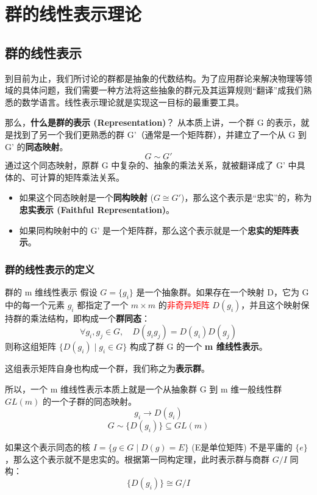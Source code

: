 
\chapter{群的线性表示理论}
\section{群的线性表示}
到目前为止，我们所讨论的群都是抽象的代数结构。为了应用群论来解决物理等领域的具体问题，我们需要一种方法将这些抽象的群元及其运算规则“翻译”成我们熟悉的数学语言。线性表示理论就是实现这一目标的最重要工具。

那么，\textbf{什么是群的表示 (Representation)}？
从本质上讲，一个群 G 的表示，就是找到了另一个我们更熟悉的群 G'（通常是一个矩阵群），并建立了一个从 G 到 G' 的\textbf{同态映射}。
$$
    G \sim G'
$$
通过这个同态映射，原群 G 中复杂的、抽象的乘法关系，就被翻译成了 G' 中具体的、可计算的矩阵乘法关系。


\begin{itemize}
    \item 如果这个同态映射是一个\textbf{同构映射} ($G \cong G'$)，那么这个表示是“忠实”的，称为\textbf{忠实表示 (Faithful Representation)}。
    \item 如果同构映射中的 G' 是一个矩阵群，那么这个表示就是一个\textbf{忠实的矩阵表示}。
\end{itemize}

\subsection{群的线性表示的定义}
\begin{definition}{群的 m 维线性表示}
    假设 $G=\{g_i\}$ 是一个抽象群。如果存在一个映射 D，它为 G 中的每一个元素 $g_i$ 都指定了一个 $m \times m$ 的\textcolor{red}{非奇异矩阵} $D(g_i)$，并且这个映射保持群的乘法结构，即构成一个\textbf{群同态}：
    $$
        \forall g_i, g_j \in G, \quad D(g_i g_j) = D(g_i)D(g_j)
    $$
    则称这组矩阵 $\{D(g_i) \mid g_i \in G\}$ 构成了群 G 的一个 \textbf{m 维线性表示}。
    
    这组表示矩阵自身也构成一个群，我们称之为\textbf{表示群}。
    
    所以，一个 m 维线性表示本质上就是一个从抽象群 G 到 m 维一般线性群 $GL(m)$ 的一个子群的同态映射。
    $$
        g_i \longrightarrow D(g_i)
    $$
    $$
        G \sim \{D(g_i)\} \subseteq GL(m)
    $$
\end{definition}
\begin{remark}
    如果这个表示同态的核 $I = \{g \in G \mid D(g) = E\}$ (E是单位矩阵) 不是平庸的 $\{e\}$，那么这个表示就不是忠实的。根据第一同构定理，此时表示群与商群 $G/I$ 同构：
    $$
        \{D(g_i)\} \cong G/I
    $$
\end{remark}


